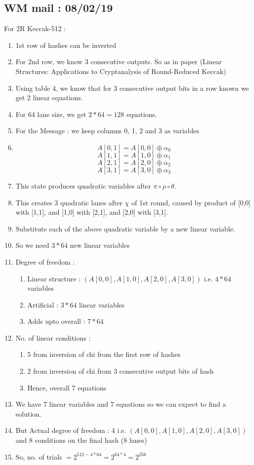 \documentclass{article}
\begin{document}
\subsection{WM mail : 08/02/19}
For 2R Keccak-512 : 
\begin{enumerate}
    \item 1st row of hashes can be inverted
    \item For 2nd row, we know 3 consecutive outputs. So as in paper (Linear Structures: Applications to Cryptanalysis of Round-Reduced Keccak)
    \item Using table 4, we know that for 3 consecutive output bits in a row known we get 2 linear equations.
    \item For 64 lane size, we get $ 2*64 = 128 $ equations.
    \item For the Message : we keep columns 0, 1, 2 and 3 as variables
    \item \[ A[0, 1] = A[0, 0] \oplus \alpha_0 \]
        \[ A[1, 1] = A[1, 0] \oplus \alpha_1 \]
         \[ A[2, 1] = A[2, 0] \oplus \alpha_2 \]
         \[ A[3, 1] = A[3, 0] \oplus \alpha_3 \]
    \item This state produces quadratic variables after $\pi \circ \rho \circ \theta$.
    \item  This creates 3 quadratic lanes after $\chi$ of 1st round, caused by product of [0,0] with [1,1], and [1,0] with [2,1], and [2,0] with [3,1].
    \item Substitute each of the above quadratic variable by a new linear variable.
    \item So we need $3*64$ new linear variables
    \item Degree of freedom : 
    \begin{enumerate}
        \item Linear structure : $( A[0,0], A[1,0], A[2,0], A[3,0] )$ i.e. $4*64$ variables
        \item Artificial : $3*64$ linear variables
        \item Adds upto overall : $7*64$
    \end{enumerate}
    \item No. of linear conditions :
    \begin{enumerate}
        \item 5 from inversion of chi from the first row of hashes
        \item 2 from inversion of chi from 3 consecutive output bits of hash
        \item Hence, overall 7 equations
    \end{enumerate}
    \item We have 7 linear variables and 7 equations so we can expect to find a solution.
    \item But Actual degree of freedom : 4 i.e. $( A[0,0], A[1,0], A[2,0], A[3,0] )$ and 8 conditions on the final hash (8 lanes)
    \item So, no. of trials $= 2^{512 - 4*64} = 2^{64*4} = 2^{256}$
\end{enumerate}
\end{document}

